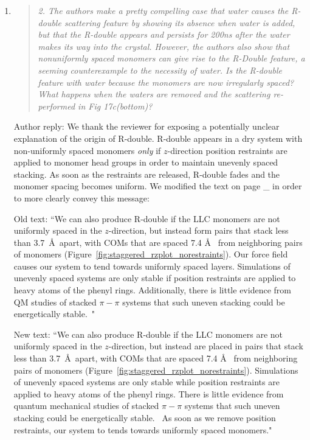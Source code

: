 \documentclass{article}
\begin{document}
\begin{enumerate}
    \item \begin{quote}
    \textit{2. The authors make a pretty compelling case that water causes the
    R-double scattering feature by showing its absence when water is added, but
    that the R-double appears and persists for 200ns after the water makes its way
    into the crystal. However, the authors also show that nonuniformly spaced
    monomers can give rise to the R-Double feature, a seeming counterexample to the
    necessity of water.  Is the R-double feature with water because the monomers
    are now irregularly spaced? What happens when the waters are removed and the
    scattering re-performed in Fig 17c(bottom)?}
    \end{quote}
    
    Author reply: We thank the reviewer for exposing a potentially unclear
    explanation of the origin of R-double. R-double appears in a dry system with
    non-uniformly spaced monomers \textit{only} if $z$-direction position
    restraints are applied to monomer head groups in order to maintain unevenly
    spaced stacking. As soon as the restraints are released, R-double fades and the
    monomer spacing becomes uniform. We modified the text on page \_ in order to more
    clearly convey this message:
 
    Old text: ``We can also produce R-double if the LLC monomers are not
    uniformly spaced in the $z$-direction, but instead form pairs that stack less
    than 3.7~\AA~apart, with COMs that are spaced 7.4 \AA~ from neighboring pairs
    of monomers (Figure~\ref{fig:staggered_rzplot_norestraints}).  Our force field
    causes our system to tend towards uniformly spaced layers. Simulations of
    unevenly spaced systems are only stable if position restraints are applied to
    heavy atoms of the phenyl rings. Additionally, there is little evidence from QM
    studies of stacked $\pi-\pi$ systems that such uneven stacking could be
    energetically stable.~\cite{tauer_beyond_2005}"

    New text: ``We can also produce R-double if the LLC monomers are not
    uniformly spaced in the $z$-direction, but instead are placed in pairs that
    stack less than 3.7~\AA~apart, with COMs that are spaced 7.4 \AA~ from
    neighboring pairs of monomers (Figure~\ref{fig:staggered_rzplot_norestraints}).
    Simulations of unevenly spaced systems are only stable while position
    restraints are applied to heavy atoms of the phenyl rings. There is little
    evidence from quantum mechanical studies of stacked $\pi-\pi$ systems that such
    uneven stacking could be energetically stable.~\cite{tauer_beyond_2005} As soon
    as we remove position restraints, our system to tends towards uniformly spaced
    monomers."


\end{enumerate}
\end{document}
